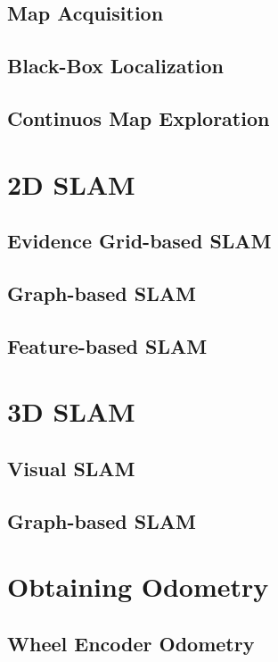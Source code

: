 \subsection{Map Acquisition}

\subsection{Black-Box Localization}

\subsection{Continuos Map Exploration}


\section{2D SLAM}

\subsection{Evidence Grid-based SLAM}

\subsection{Graph-based SLAM}

\subsection{Feature-based SLAM}


\section{3D SLAM}

\subsection{Visual SLAM}

\subsection{Graph-based SLAM}


\section{Obtaining Odometry}

\subsection{Wheel Encoder Odometry}

